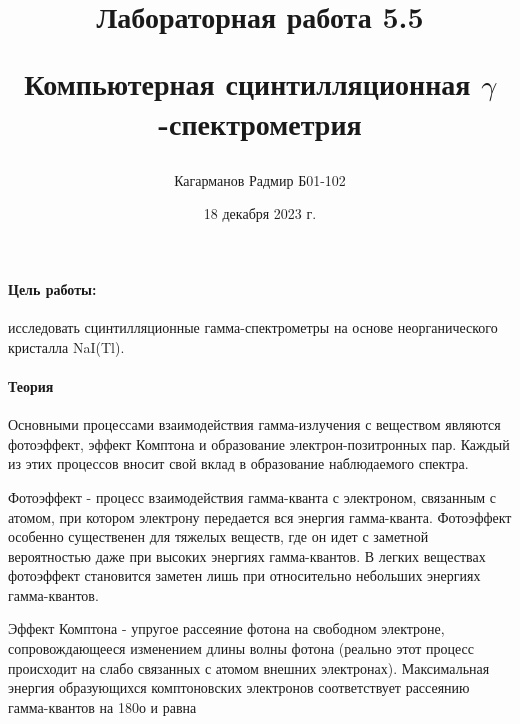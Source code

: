 \documentclass[a4paper,12pt]{article}
\title{Лабораторная работа 5.5

Компьютерная сцинтилляционная $\gamma$-спектрометрия}
\author{Кагарманов Радмир Б01-102}
\date{18 декабря 2023 г.}
\begin{document}
\maketitle
\thispagestyle{empty}
\newpage
\setcounter{page}{1}

\paragraph{Цель работы:}исследовать сцинтилляционные гамма-спектрометры на основе неорганического кристалла NaI(Tl).

\paragraph{Теория\\}
Основными процессами взаимодействия гамма-излучения с веществом
являются фотоэффект, эффект Комптона и образование электрон-позитронных пар. Каждый из этих процессов вносит свой
вклад в образование наблюдаемого спектра. \par
Фотоэффект - процесс взаимодействия гамма-кванта с электроном, связанным с атомом, при котором электрону передается вся энергия гамма-кванта. Фотоэффект особенно существенен для тяжелых веществ, где он идет с заметной вероятностью даже при высоких энергиях гамма-квантов. В легких
веществах фотоэффект становится заметен лишь при относительно небольших энергиях гамма-квантов.\par

Эффект Комптона - упругое рассеяние фотона на свободном электроне,
сопровождающееся изменением длины волны фотона (реально этот процесс
происходит на слабо связанных с атомом внешних электронах). Максимальная энергия образующихся комптоновских электронов соответствует рассеянию гамма-квантов на 180о
и равна\par
\end{document}
